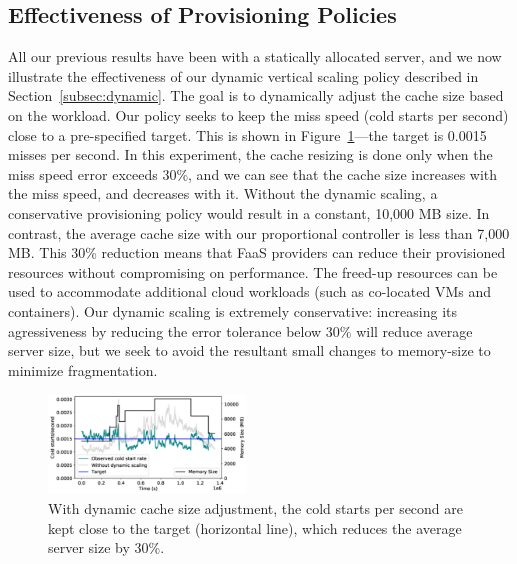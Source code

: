 \subsection{Effectiveness of Provisioning Policies}
\vspace*{\subsecspace}
All our previous results have been with a statically allocated server, and 
we now illustrate the effectiveness of our dynamic vertical scaling policy described in Section~\ref{subsec:dynamic}.
The goal is to dynamically adjust the cache size based on the workload. 
Our  policy seeks to keep the miss speed (cold starts per second) close to a pre-specified target. 
This is shown in Figure~\ref{fig:dynamic}---the target is 0.0015 misses per second. 
In this experiment, the cache resizing is done only when the miss speed error exceeds 30\%, and we can see that the cache size increases with the miss speed, and decreases with it. 
Without the dynamic scaling, a conservative provisioning policy would result in a constant, 10,000 MB size. 
In contrast, the average cache size with our proportional controller is less than 7,000 MB.
This 30\% reduction means that FaaS providers can reduce their provisioned resources without compromising on performance.
The freed-up resources can be used to accommodate additional cloud workloads (such as co-located VMs and containers). 
Our dynamic scaling is extremely conservative: increasing its agressiveness by reducing the error tolerance below 30\% will reduce  average server size,
but we seek to avoid the resultant small changes to memory-size to minimize fragmentation. 

\begin{figure}[t]
    \vspace*{\myfigspace}
  \centering 
  \includegraphics[width=0.47\textwidth]{../graphs/dyn-scale-392-b.pdf}
    \vspace*{\myfigspace}
  \caption{With dynamic cache size adjustment, the cold starts per second are kept close to the target (horizontal line), which reduces the average server size by 30\%. }
  \label{fig:dynamic}
  \vspace*{\myfigspace}
\end{figure}


